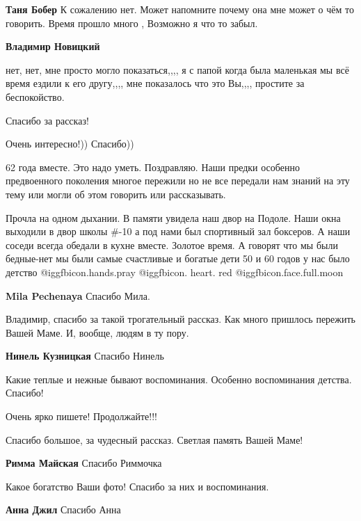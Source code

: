 \begin{itemize}
\begin{itemize}
\textbf{Таня Бобер} К сожалению нет. Может напомните почему она мне может о чём то говорить. Время прошло много , Возможно я что то забыл.

\textbf{Владимир Новицкий} 

нет, нет, мне просто могло показаться,,,, я с папой когда была маленькая мы всё
время ездили к его другу,,,, мне показалось что это Вы,,,, простите за
беспокойство.

\end{itemize} %

Спасибо за рассказ!

Очень интересно!)) Спасибо))


62 года вместе. Это надо уметь. Поздравляю. Наши предки особенно предвоенного
поколения многое пережили но не все передали нам знаний на эту тему или могли
об этом говорить или рассказывать.


Прочла на одном дыхании. В памяти увидела наш двор на Подоле. Наши окна
выходили в двор школы \#-10 а под нами был спортивный зал боксеров. А наши
соседи всегда обедали в кухне вместе. Золотое время. А говорят что мы были
бедные-нет мы были самые счастливые и богатые дети 50 и 60 годов у нас было
детство @igg{fbicon.hands.pray} @igg{fbicon. heart. red}
@igg{fbicon.face.full.moon} 

\textbf{Mila Pechenaya} Спасибо Мила.

Владимир, спасибо за такой трогательный рассказ. Как много пришлось пережить
Вашей Маме. И, вообще, людям в ту пору.

\textbf{Нинель Кузницкая} Спасибо Нинель

Какие теплые и нежные бывают воспоминания. Особенно воспоминания детства. Спасибо!

Очень ярко пишете! Продолжайте!!!

Спасибо большое, за чудесный рассказ. Светлая память Вашей Маме!

\textbf{Римма Майская} Спасибо Риммочка

Какое богатство Ваши фото!
Спасибо за них и воспоминания.

\textbf{Анна Джил} Спасибо Анна


\end{itemize}
